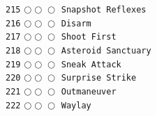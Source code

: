 \documentclass[a4paper,landscape]{article}
\begin{document}
\begin{multicols*}{5}
\texttt{215} \(\bigcirc\!\bigcirc\!\bigcirc\)  \texttt{Snapshot Reflexes} \vspace{-0.3mm}\\ 
\texttt{216} \(\bigcirc\!\bigcirc\!\bigcirc\)  \texttt{Disarm} \vspace{-0.3mm}\\ 
\texttt{217} \(\bigcirc\!\bigcirc\!\bigcirc\)  \texttt{Shoot First} \vspace{-0.3mm}\\ 
\texttt{218} \(\bigcirc\!\bigcirc\!\bigcirc\)  \texttt{Asteroid Sanctuary} \vspace{-0.3mm}\\ 
\texttt{219} \(\bigcirc\!\bigcirc\!\bigcirc\)  \texttt{Sneak Attack} \vspace{-0.3mm}\\ 
\texttt{220} \(\bigcirc\!\bigcirc\!\bigcirc\)  \texttt{Surprise Strike} \vspace{-0.3mm}\\ 
\texttt{221} \(\bigcirc\!\bigcirc\!\bigcirc\)  \texttt{Outmaneuver} \vspace{-0.3mm}\\ 
\texttt{222} \(\bigcirc\!\bigcirc\!\bigcirc\)  \texttt{Waylay} \vspace{-0.3mm}\\ 

\end{multicols*}
\end{document}
